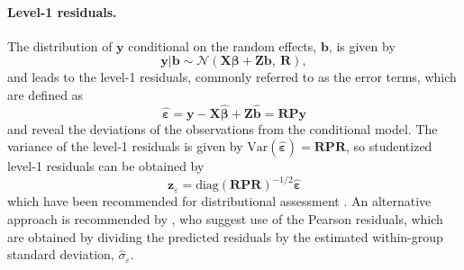 \documentclass[11pt]{article} %
\newcommand{\var}{\ensuremath{\mathrm{Var}}}
\begin{document}
\paragraph{Level-1 residuals.}
The distribution of $\bm{y}$ conditional on the random effects, $\bm{b}$, is given by
%
\begin{equation}\label{eq:marginalmodel}
	\bm{y} | \bm{b} \sim \mathcal{N}( \bm{X\beta} + \bm{Zb},\ \bm{R} ),
\end{equation}
%
and leads to the level-1 residuals, commonly referred to as the error terms, which are defined as
%
\begin{equation}\label{eq:lev1resid}
	\widehat{\bm{\varepsilon}} = \bm{y} - \bm{X \widehat{\beta}} + \bm{Z \widehat{b}} = \bm{R P y}
\end{equation}
%
and reveal the deviations of the observations from the conditional model. The variance of the level-1 residuals is given by $\var(\widehat{\bm{\varepsilon}}) = \bm{ R P R }$, so studentized level-1 residuals can be obtained by 
%
\begin{equation}\label{eq:lev1-std}
\bm{z}_{\varepsilon} =  \text{diag} \left(\bm{RPR} \right)^{-1/2} \widehat{\bm{\varepsilon}}
\end{equation}
%
which have been recommended for distributional assessment \citep{Nobre:2007ej}. An alternative approach is recommended by \citet[Section 4.3]{Pinhiero:2000vf}, who suggest use of the Pearson residuals, which are obtained by dividing the predicted residuals by the estimated within-group standard deviation, $\widehat{\sigma}_\varepsilon$. 
\end{document}
